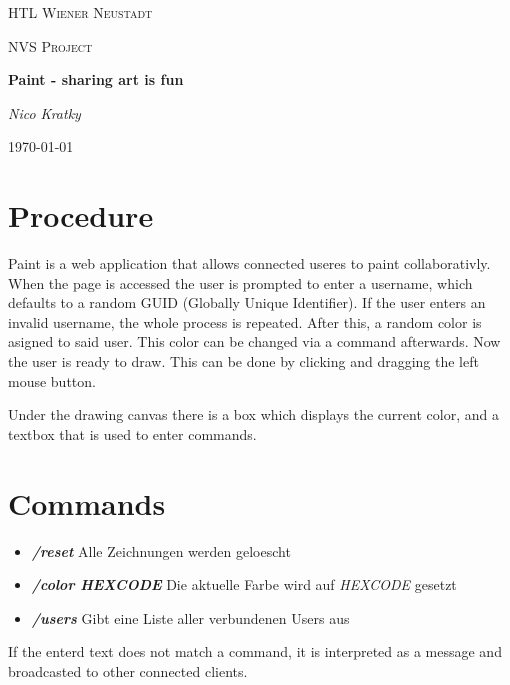 \documentclass[12pt]{article}
\begin{document}
\begin{titlepage}
  \centering
  {\scshape\LARGE HTL Wiener Neustadt \par}
  \vspace{1cm}
  {\scshape\Large NVS Project\par}
  \vspace{1.5cm}
  {\huge\bfseries Paint - sharing art is fun\par}
  \vspace{2cm}
  {\Large\itshape Nico Kratky\par}

  \vfill

  {\large \today\par}
\end{titlepage}

\section{Procedure}
Paint is a web application that allows connected useres to paint collaborativly. When the page is accessed the user is prompted to enter a username, which defaults to a random GUID (Globally Unique Identifier). If the user enters an invalid username, the whole process is repeated. After this, a random color is asigned to said user. This color can be changed via a command afterwards. Now the user is ready to draw. This can be done by clicking and dragging the left mouse button.


Under the drawing canvas there is a box which displays the current color, and a textbox that is used to enter commands.

\section{Commands}
\begin{itemize}

\item \textbf{\textit{/reset}} Alle Zeichnungen werden geloescht
\item \textbf{\textit{/color HEXCODE}} Die aktuelle Farbe wird auf \textit{HEXCODE} gesetzt
\item \textbf{\textit{/users}} Gibt eine Liste aller verbundenen Users aus

\end{itemize}

If the enterd text does not match a command, it is interpreted as a message and broadcasted to other connected clients.
\end{document}
